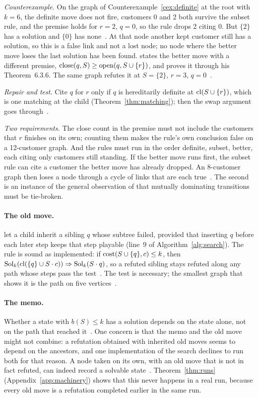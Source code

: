 \emph{Counterexample.} On the graph of Counterexample~\ref{cex:definite} at the
root with $k=6$, the definite move does not fire, customers 0 and 2 both
survive the subset rule, and the premise holds for $r=2$, $q=0$, so the rule
drops 2 citing 0. But $\{2\}$ has a solution and $\{0\}$ has
none~. At that node another kept customer still has a
solution, so this is a false link and not a lost node; no node where the
better move loses the last solution has been found. \citet[Thm~6.3.8,
p.~143]{Chu2011} states the better move with a different premise,
$\mathrm{close}(q,S)\ge\mathrm{open}(q,S\cup\{r\})$, and proves it through his Theorem~6.3.6.
The same graph refutes it at $S=\{2\}$, $r=3$, $q=0$~.

\emph{Repair and test.} Cite $q$ for $r$ only if $q$ is hereditarily definite
at $\mathrm{cl}(S\cup\{r\})$, which is one matching at the child
(Theorem~\ref{thm:matching}); then the swap argument goes
through~.

\emph{Two requirements.} The close count in the premise must not include the
customers that $r$ finishes on its own; counting them makes the rule's own
conclusion false on a 12-customer graph. And the rules must run in the order
definite, subset, better, each citing only customers still standing. If the
better move runs first, the subset rule can cite a customer the better move
has already dropped. An 8-customer graph then loses a node through a cycle of
links that are each true~. The second is an instance of the
general observation of \citet[Prop.~3, Example~6]{Beck2025} that mutually
dominating transitions must be tie-broken.

\paragraph{The old move.} \citet[Thm~3, p.~7]{ChuStuckey2009} let a child
inherit a sibling $q$ whose subtree failed, provided that inserting $q$ before
each later step keeps that step playable (line~9 of
Algorithm~\ref{alg:search}). The rule is sound as implemented: if
$\mathrm{cost}(S\cup\{q\},c)\le k$, then
$\mathrm{Sol}_k(\mathrm{cl}(\{q\}\cup S\cdot c))\Rightarrow\mathrm{Sol}_k(S\cdot q)$, so a refuted
sibling stays refuted along any path whose steps pass the test~.
The test is necessary; the smallest graph that shows it is the path on five
vertices~.

\paragraph{The memo.} Whether a state with $b(S)\le k$ has a solution depends
on the state alone, not on the path that reached it~. One
concern is that the memo and the old move might not combine: a refutation
obtained with inherited old moves seems to depend on the ancestors, and one
implementation of the search declines to run both for that reason. A node
taken on its own, with an old move that is not in fact refuted, can indeed
record a solvable state~. Theorem~\ref{thm:runs}
(Appendix~\ref{app:machinery}) shows that this never happens in a real run,
because every old move is a refutation completed earlier in the same run.

